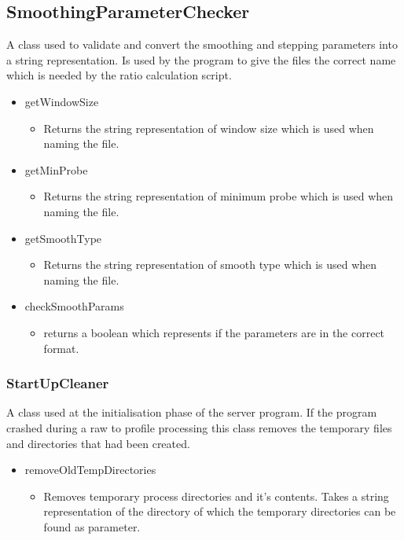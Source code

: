\subsection{SmoothingParameterChecker}

A class used to validate and convert the smoothing and stepping parameters into a string representation. Is used by the program to give the files the correct name which is needed by the ratio calculation script. 

\begin{itemize}
\item getWindowSize
\begin{itemize}
\item Returns the string representation of window size which is used when naming the file.
\end{itemize}
\item getMinProbe
\begin{itemize}
\item Returns the string representation of minimum probe which is used when naming the file.
\end{itemize}
\item getSmoothType
\begin{itemize}
\item Returns the string representation of smooth type which is used when naming the file.
\end{itemize}
\item checkSmoothParams
\begin{itemize}
\item returns a boolean which represents if the parameters are in the correct format.
\end{itemize}
\end{itemize}

\subsubsection{StartUpCleaner}

A class used at the initialisation phase of the server program. If the program crashed during a raw to profile processing this class removes the temporary files and directories that had been created.

\begin{itemize}
\item removeOldTempDirectories
\begin{itemize}
\item Removes temporary process directories and it's contents. Takes a string representation of the directory of which the temporary directories can be found as parameter.
\end{itemize}
\end{itemize}

